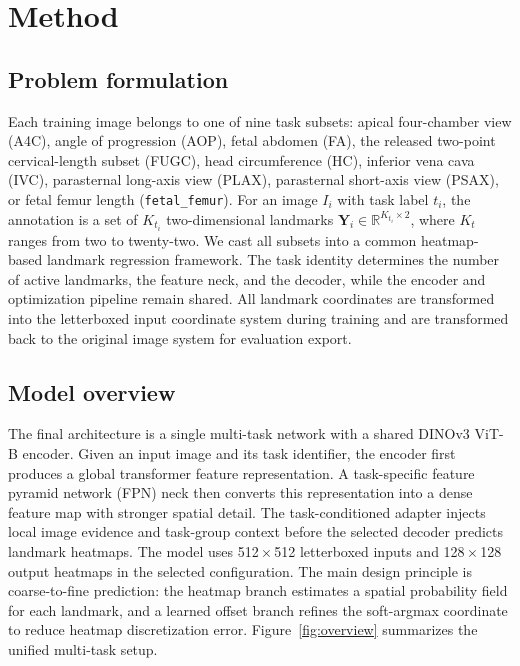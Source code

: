 \documentclass[runningheads]{llncs}
\begin{document}
\section{Method}
\subsection{Problem formulation}
\label{sec:problem-formulation}
Each training image belongs to one of nine task subsets: apical four-chamber view (A4C), angle of progression (AOP), fetal abdomen (FA), the released two-point cervical-length subset (FUGC), head circumference (HC), inferior vena cava (IVC), parasternal long-axis view (PLAX), parasternal short-axis view (PSAX), or fetal femur length (\texttt{fetal\_femur}). For an image $I_i$ with task label $t_i$, the annotation is a set of $K_{t_i}$ two-dimensional landmarks $\mathbf{Y}_i \in \mathbb{R}^{K_{t_i}\times 2}$, where $K_t$ ranges from two to twenty-two. We cast all subsets into a common heatmap-based landmark regression framework. The task identity determines the number of active landmarks, the feature neck, and the decoder, while the encoder and optimization pipeline remain shared. All landmark coordinates are transformed into the letterboxed input coordinate system during training and are transformed back to the original image system for evaluation export.

\subsection{Model overview}
The final architecture is a single multi-task network with a shared DINOv3 ViT-B encoder. Given an input image and its task identifier, the encoder first produces a global transformer feature representation. A task-specific feature pyramid network (FPN) neck then converts this representation into a dense feature map with stronger spatial detail. The task-conditioned adapter injects local image evidence and task-group context before the selected decoder predicts landmark heatmaps. The model uses 512\,$\times$\,512 letterboxed inputs and 128\,$\times$\,128 output heatmaps in the selected configuration. The main design principle is coarse-to-fine prediction: the heatmap branch estimates a spatial probability field for each landmark, and a learned offset branch refines the soft-argmax coordinate to reduce heatmap discretization error. Figure~\ref{fig:overview} summarizes the unified multi-task setup.
\end{document}
